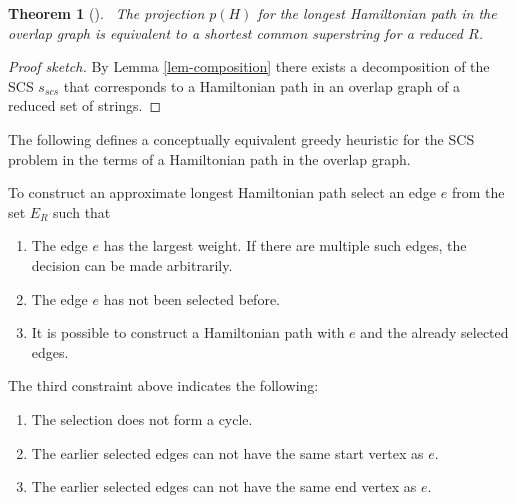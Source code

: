 \documentclass[english,twoside,censored,csm,algorithms-track-2020]{HYthesisML}
\theoremstyle{plain}
\newtheorem{theorem}{Theorem}[chapter]
\theoremstyle{definition}
\begin{document}
\begin{theorem} [] ~\label{lem-similarity-between-SCS-Hamp}
  The projection $p(H)$ for the longest Hamiltonian path in the overlap graph is equivalent to
  a shortest common superstring for a reduced $R$.
\end{theorem}
\begin{proof}[Proof sketch]
By Lemma \ref{lem-composition} there exists a decomposition of the SCS $s_{scs}$ that corresponds to a
Hamiltonian path in an overlap graph of a reduced set of strings.
\end{proof}

The following defines a conceptually equivalent greedy heuristic for the SCS problem in the terms of
a Hamiltonian path in the overlap graph.

To  construct an approximate longest Hamiltonian path select an edge $e$ from the set $E_R$ such that

\begin{enumerate}
\item The edge $e$ has the largest weight. If there are multiple such edges, the decision can be made arbitrarily.
\item The edge $e$ has not been selected before.
\item It is possible to construct a Hamiltonian path with $e$ and the already selected edges. 
\end{enumerate}

The third constraint above indicates the following:
\begin{enumerate}[label=\roman*]
\item The selection does not form a cycle.
\item The earlier selected edges can not have the same start vertex as $e$.
\item The earlier selected edges can not have the same end vertex as $e$.
\end{enumerate}





\end{document}
